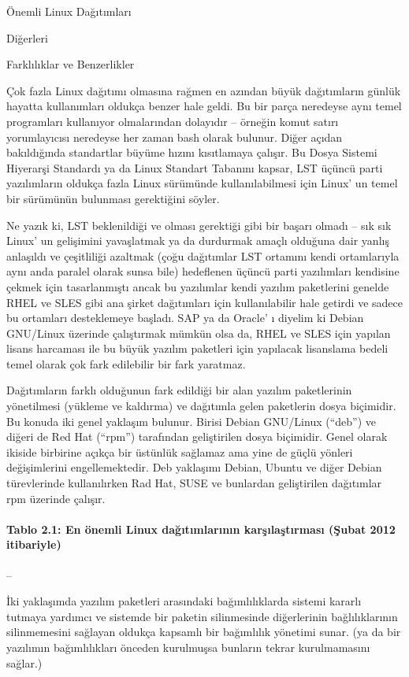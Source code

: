\documentclass[10pt,a5paper]{book}
\begin{document}
\begin{section}{Önemli Linux Dağıtımları}
\begin{subsection}{Diğerleri}
\end{subsection}
\begin{subsection}{Farklılıklar ve Benzerlikler}

Çok fazla Linux dağıtımı olmasına rağmen en azından büyük dağıtımların günlük hayatta kullanımları oldukça benzer hale geldi. Bu bir parça neredeyse aynı temel programları kullanıyor olmalarından dolayıdır – örneğin komut satırı yorumlayıcısı neredeyse her zaman bash olarak bulunur. Diğer açıdan bakıldığında standartlar büyüme hızını kısıtlamaya çalışır. Bu Dosya Sistemi Hiyerarşi Standardı ya da Linux Standart Tabanını kapsar, LST üçüncü parti yazılımların oldukça fazla Linux sürümünde kullanılabilmesi için Linux' un temel bir sürümünün bulunması gerektiğini söyler.

Ne yazık ki, LST beklenildiği ve olması gerektiği gibi bir başarı olmadı – sık sık Linux' un gelişimini yavaşlatmak ya da durdurmak amaçlı olduğuna dair yanlış anlaşıldı ve çeşitliliği azaltmak (çoğu dağıtımlar LST ortamını kendi ortamlarıyla aynı anda paralel olarak sunsa bile) hedeflenen üçüncü parti yazılımları kendisine çekmek için tasarlanmıştı ancak bu yazılımlar kendi yazılım paketlerini genelde RHEL ve SLES gibi ana şirket dağıtımları için kullanılabilir hale getirdi ve sadece bu ortamları desteklemeye başladı. SAP ya da Oracle' ı diyelim ki Debian GNU/Linux üzerinde çalıştırmak mümkün olsa da, RHEL ve SLES için yapılan lisans harcaması ile bu büyük yazılım paketleri için yapılacak lisanslama bedeli temel olarak çok fark edilebilir bir fark yaratmaz.

Dağıtımların farklı olduğunun fark edildiği bir alan yazılım paketlerinin yönetilmesi (yükleme ve kaldırma) ve dağıtımla gelen paketlerin dosya biçimidir. Bu konuda iki genel yaklaşım bulunur. Birisi Debian GNU/Linux (“deb”) ve diğeri de Red Hat (“rpm”) tarafından geliştirilen dosya biçimidir. Genel olarak ikiside birbirine açıkça bir üstünlük sağlamaz ama yine de güçlü yönleri değişimlerini engellemektedir. Deb yaklaşımı Debian, Ubuntu ve diğer Debian türevlerinde kullanılırken Rad Hat, SUSE ve bunlardan geliştirilen dağıtımlar rpm üzerinde çalışır.
\paragraph{Tablo 2.1: En önemli Linux dağıtımlarının karşılaştırması (Şubat 2012 itibariyle)}{ --}

İki yaklaşımda yazılım paketleri arasındaki bağımlılıklarda sistemi kararlı tutmaya yardımcı ve sistemde bir paketin silinmesinde diğerlerinin bağlılıklarının silinmemesini sağlayan oldukça kapsamlı bir bağımlılık yönetimi sunar. (ya da bir yazılımın bağımlılıkları önceden kurulmuşsa bunların tekrar kurulmamasını sağlar.)


\end{subsection}
\end{section}
\end{document}
